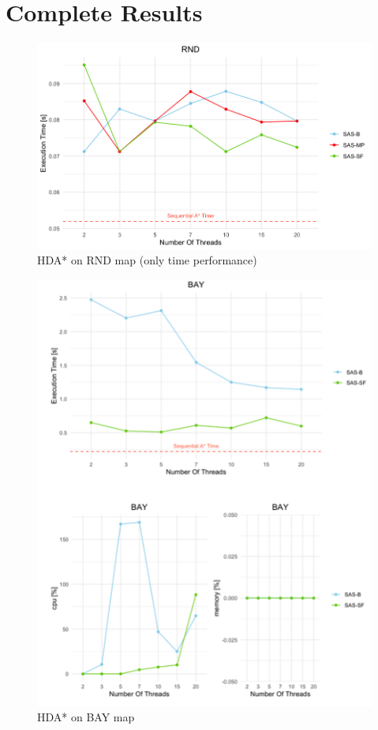 \documentclass[twocolumn, switch]{article} %
\begin{document}
\section{Complete Results}
\begin{figure}[ht!]
  \centering
  \includegraphics[width=1\linewidth]{hda/rnd.png}
  \caption{HDA* on RND map (only time performance)}
  \label{hdarnd}
\end{figure}
\begin{figure}[ht!]
  \centering
  \includegraphics[width=1\linewidth]{hda/bay.png}
  \caption{HDA* on BAY map}
  \label{hdabay}
\end{figure}
\end{document}
